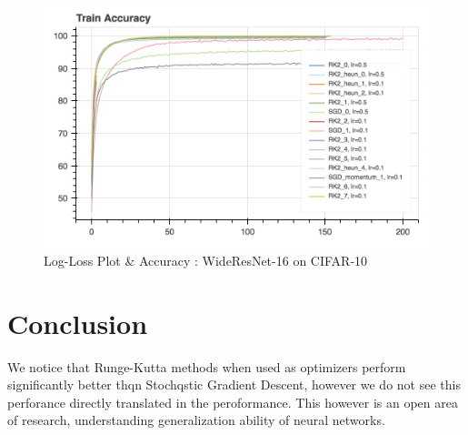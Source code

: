\begin{figure}[htb]
\includegraphics[scale=0.5]{plots/wide_resnet16_3.png}


\caption{Log-Loss Plot \& Accuracy : WideResNet-16 on CIFAR-10}
\end{figure}

\section{Conclusion}
We notice that Runge-Kutta methods when used as optimizers
perform significantly better thqn Stochqstic Gradient
Descent, however we do not see this perforance directly
translated in the peroformance. This however is an open
area of research, understanding generalization ability
of neural networks.








